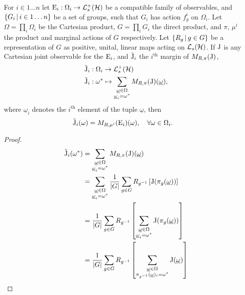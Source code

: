 \begin{lem}\label{lem:margins-inv-mean-same}
  For $i\in 1\hdots n$ let $\ope_i:\Omega_i \to \posops[\hcal]$ be a compatible family of observables, and $\left\{G_i\,\middle|\,i\in 1\hdots n\right\}$ be a set of groups, such that $G_i$ has action $f_g^i$ on $\Omega_i$. Let $\Omega = \prod_i \Omega_i$ be the Cartesian product, $G = \prod_i G_i$ the direct product, and $\pi$, $\mu^i$ the product and marginal actions of $G$ respectively. Let $\left\{R_g\,\middle|\,g\in G\right\}$ be a representation of $G$ as positive, unital, linear maps acting on $\saops[\hcal]$. If $\operatorname{J}$ is any Cartesian joint observable for the $\operatorname{E}_i$, and $\tilde{\operatorname{J}}_i$ the $i^\text{th}$ margin of $M_{R,\pi}(\operatorname{J})$,
  \begin{align}
    \tilde{\opj}_i&: \Omega_i \to \posops[\hcal]\\
    \tilde{\opj}_i &: \omega^* \mapsto \sum_{\substack{\underline{\omega} \in \Omega\\ \underline{\omega}_i = \omega^*}}M_{R,\pi}(\opj)(\underline{\omega}),
  \end{align}
  where $\underline{\omega}_i$ denotes the $i^\text{th}$ element of the tuple $\underline{\omega}$, then
  \begin{align}
    \tilde{\operatorname{J}}_i(\omega) &= M_{R,\mu^i}(\operatorname{E}_i)(\omega), \quad \forall \omega \in \Omega_i.
  \end{align} %
  \begin{proof}
    \begin{align}
      \tilde{\opj}_i(\omega^*) &= \sum_{\substack{\underline{\omega} \in \Omega\\ \underline{\omega}_i = \omega^*}}M_{R,\pi}(\opj)(\underline{\omega})\\
                               &= \sum_{\substack{\underline{\omega} \in \Omega\\ \underline{\omega}_i = \omega^*}} \frac{1}{\abs{G}}\sum_{g\in G} R_{g^{-1}}\left[\opj(\pi_g(\underline{\omega}))\right]\\
                               &= \frac{1}{\abs{G}}\sum_{g\in G} R_{g^{-1}}\left[\sum_{\substack{\underline{\omega} \in \Omega\\ \underline{\omega}_i = \omega^*}} \opj(\pi_g(\underline{\omega}))\right]\\
                               &= \frac{1}{\abs{G}}\sum_{g\in G} R_{g^{-1}}\left[\sum_{\substack{\underline{\omega} \in \Omega\\ \pi_{g^{-1}}(\underline{\omega})_i = \omega^*}} \opj(\underline{\omega})\right]\\

\end{align}
\end{proof}
\end{lem}
